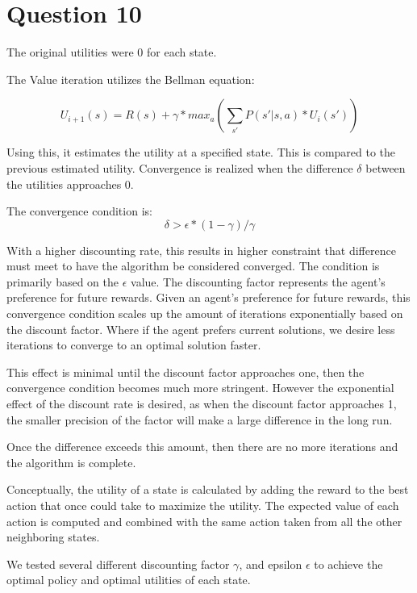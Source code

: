 \section{Question 10}
The original utilities were 0 for each state.

The Value iteration utilizes the Bellman equation:

\[ 
U_{i+1}(s) = R(s) + \gamma* max_a(\sum_{s'}P(s'|s,a)*U_i(s'))
\]

Using this, it estimates the utility at a specified state. This is compared to the previous estimated utility. Convergence is realized when the difference $\delta$ between the utilities approaches 0.

The convergence condition is: \[ \delta > \epsilon* (1 - \gamma) / \gamma  \]

With a higher discounting rate, this results in higher constraint that difference must meet to have the algorithm be considered converged. The condition is primarily based on the $\epsilon$ value.
The discounting factor represents the agent's preference for future rewards. Given an agent's preference for future rewards, this convergence condition scales up the amount of iterations exponentially based on the discount factor. Where if the agent prefers current solutions, we desire less iterations to converge to an optimal solution faster.

This effect is minimal until the discount factor approaches one, then the convergence condition becomes much more stringent. However the exponential effect of the discount rate is desired, as when the discount factor approaches 1, the smaller precision of the factor will make a large difference in the long run.

Once the difference exceeds this amount, then there are no more iterations and the algorithm is complete.

Conceptually, the utility of a state  is calculated by adding the reward to the best action that once could take to maximize the utility. The expected value of each action is computed and combined with the same action taken from all the other neighboring states.

We tested several different discounting factor $\gamma$, and epsilon $\epsilon$ to achieve the optimal policy and optimal utilities of each state.

